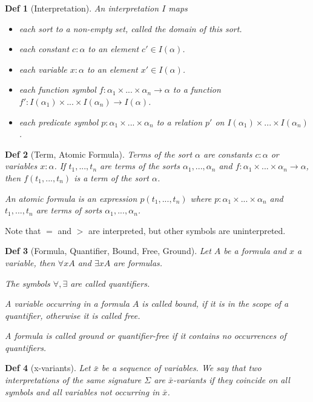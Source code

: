 \documentclass[]{article}
\newtheorem*{definition*}{Def}
\begin{document}
\begin{definition*}[Interpretation]
	An interpretation $I$ maps
	\begin{itemize}
		\item each sort to a non-empty set, called the domain of this sort.
		\item each constant $c:\alpha$ to an element $c' \in I(\alpha)$.
		\item each variable $x: \alpha$ to an element $x' \in I(\alpha)$.
		\item each function symbol $f: \alpha_1 \times ... \times \alpha_n \rightarrow \alpha$ to a function $f':I(\alpha_1) \times ... \times I(\alpha_n) \rightarrow I(\alpha)$.
		\item each predicate symbol $p: \alpha_1 \times ... \times \alpha_n$ to a relation $p'$ on $I(\alpha_1) \times ... \times I(\alpha_n)$.
	\end{itemize}
\end{definition*}

\begin{definition*}[Term, Atomic Formula]
	Terms of the sort $\alpha$ are constants $c: \alpha$ or variables $x: \alpha$. If $t_1, ..., t_n$ are terms of the sorts $\alpha_1, ..., \alpha_n$ and $f: \alpha_1 \times ... \times \alpha_n \rightarrow \alpha$, then $f(t_1, ..., t_n)$ is a term of the sort $\alpha$.
	
	An atomic formula is an expression $p(t_1, ..., t_n)$ where $p: \alpha_1 \times ... \times \alpha_n$ and $t_1, ..., t_n$ are terms of sorts $\alpha_1, ..., \alpha_n$.
\end{definition*}

Note that $=$ and $>$ are interpreted, but other symbols are uninterpreted.

\begin{definition*}[Formula, Quantifier, Bound, Free, Ground]
	Let $A$ be a formula and $x$ a variable, then $\forall x A$ and $\exists x A$ are formulas.
	
	The symbols $\forall, \exists$ are called quantifiers.
	
	A variable occurring in a formula $A$ is called bound, if it is in the scope of a quantifier, otherwise it is called free.
	
	A formula is called ground or quantifier-free if it contains no occurrences of quantifiers.
\end{definition*}

\begin{definition*}[x-variants]
	Let $\bar{x}$ be a sequence of variables. We say that two interpretations of the same signature $\Sigma$ are $\bar{x}$-variants if they coincide on all symbols and all variables not occurring in $\bar{x}$.
\end{definition*}
\end{document}
